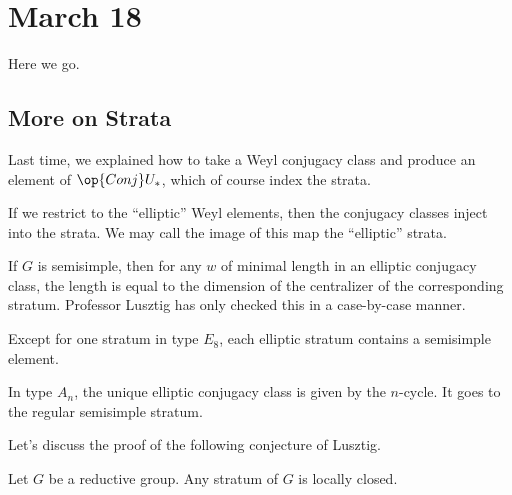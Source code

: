 \documentclass[../notes.tex]{subfiles}
\begin{document}
\section{March 18}
Here we go.

\subsection{More on Strata}
Last time, we explained how to take a Weyl conjugacy class and produce an element of $\op{Conj}U_*$, which of course index the strata. 
\begin{remark}
	If we restrict to the ``elliptic'' Weyl elements, then the conjugacy classes inject into the strata. We may call the image of this map the ``elliptic'' strata.
\end{remark}
\begin{remark}
	If $G$ is semisimple, then for any $w$ of minimal length in an elliptic conjugacy class, the length is equal to the dimension of the centralizer of the corresponding stratum. Professor Lusztig has only checked this in a case-by-case manner.
\end{remark}
\begin{remark}
	Except for one stratum in type $E_8$, each elliptic stratum contains a semisimple element.
\end{remark}
\begin{example}
	In type $A_n$, the unique elliptic conjugacy class is given by the $n$-cycle. It goes to the regular semisimple stratum.
\end{example}
Let's discuss the proof of the following conjecture of Lusztig.
\begin{theorem}[Carnovale]
	Let $G$ be a reductive group. Any stratum of $G$ is locally closed.
\end{theorem}
\end{document}
